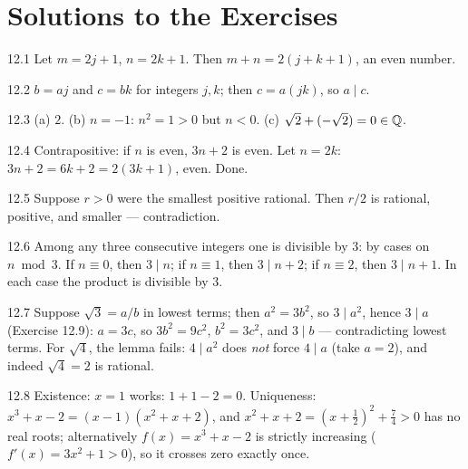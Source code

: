 \section*{Solutions to the Exercises}

\begin{solution}{12.1}
Let $m = 2j+1$, $n = 2k+1$. Then $m + n = 2(j + k + 1)$, an even number.
\end{solution}

\begin{solution}{12.2}
$b = aj$ and $c = bk$ for integers $j,k$; then $c = a(jk)$, so $a \mid c$.
\end{solution}

\begin{solution}{12.3}
(a) $2$. (b) $n = -1$: $n^2 = 1 > 0$ but $n < 0$. (c) $\sqrt2 + (-\sqrt2)
= 0 \in \mathbb{Q}$.
\end{solution}

\begin{solution}{12.4}
Contrapositive: if $n$ is even, $3n + 2$ is even. Let $n = 2k$:
$3n + 2 = 6k + 2 = 2(3k+1)$, even. Done.
\end{solution}

\begin{solution}{12.5}
Suppose $r > 0$ were the smallest positive rational. Then $r/2$ is rational,
positive, and smaller --- contradiction.
\end{solution}

\begin{solution}{12.6}
Among any three consecutive integers one is divisible by $3$: by cases on
$n \bmod 3$. If $n \equiv 0$, then $3 \mid n$; if $n \equiv 1$, then
$3 \mid n + 2$; if $n \equiv 2$, then $3 \mid n + 1$. In each case the
product is divisible by $3$.
\end{solution}

\begin{solution}{12.7}
Suppose $\sqrt3 = a/b$ in lowest terms; then $a^2 = 3b^2$, so $3 \mid a^2$,
hence $3 \mid a$ (Exercise 12.9): $a = 3c$, so $3b^2 = 9c^2$,
$b^2 = 3c^2$, and $3 \mid b$ --- contradicting lowest terms. For $\sqrt4$,
the lemma fails: $4 \mid a^2$ does \emph{not} force $4 \mid a$ (take
$a = 2$), and indeed $\sqrt4 = 2$ is rational.
\end{solution}

\begin{solution}{12.8}
Existence: $x = 1$ works: $1 + 1 - 2 = 0$. Uniqueness:
$x^3 + x - 2 = (x-1)(x^2 + x + 2)$, and $x^2 + x + 2 =
(x + \tfrac12)^2 + \tfrac74 > 0$ has no real roots; alternatively
$f(x) = x^3 + x - 2$ is strictly increasing
($f'(x) = 3x^2 + 1 > 0$), so it crosses zero exactly once.
\end{solution}

